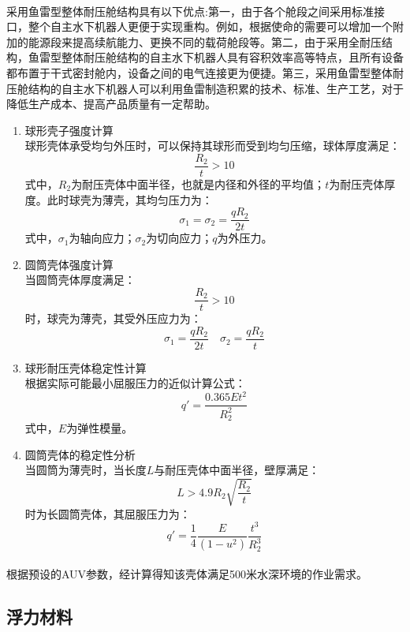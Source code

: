 \documentclass{ctexart}
\begin{document}
    \paragraph{}采用鱼雷型整体耐压舱结构具有以下优点:第一，由于各个舱段之间采用标准接口，整个自主水下机器人更便于实现重构。例如，根据使命的需要可以增加一个附加的能源段来提高续航能力、更换不同的载荷舱段等。第二，由于采用全耐压结构，鱼雷型整体耐压舱结构的自主水下机器人具有容积效率高等特点，且所有设备都布置于干式密封舱内，设备之间的电气连接更为便捷。第三，采用鱼雷型整体耐压舱结构的自主水下机器人可以利用鱼雷制造积累的技术、标准、生产工艺，对于降低生产成本、提高产品质量有一定帮助。
    \begin{enumerate}
        \item 球形壳子强度计算 \\
        球形壳体承受均匀外压时，可以保持其球形而受到均匀压缩，球体厚度满足：
        \[\frac{R_2}{t}>10\]
        式中，$R_2$为耐压壳体中面半径，也就是内径和外径的平均值；$t$为耐压壳体厚度。此时球壳为薄壳，其均匀压力为：
        \[\sigma_1=\sigma_2=\frac{qR_2}{2t}\]
        式中，$\sigma_1$为轴向应力；$\sigma_2$为切向应力；$q$为外压力。
        \item 圆筒壳体强度计算 \\
        当圆筒壳体厚度满足：
        \[\frac{R_2}{t}>10\]
        时，球壳为薄壳，其受外压应力为：
        \[\sigma_1=\frac{qR_2}{2t} \quad \sigma_2=\frac{qR_2}{t}\]
        \item 球形耐压壳体稳定性计算 \\
        根据实际可能最小屈服压力的近似计算公式：
        \[q'=\frac{0.365Et^2}{R_2^2}\]
        式中，$E$为弹性模量。
        \item 圆筒壳体的稳定性分析 \\
        当圆筒为薄壳时，当长度$L$与耐压壳体中面半径，壁厚满足：
        \[L>4.9R_2\sqrt{\frac{R_2}{t}}\]
        时为长圆筒壳体，其屈服压力为：
        \[q'=\frac{1}{4}\frac{E}{(1-u^2)}\frac{t^3}{R_2^3}\]
    \end{enumerate}
    \paragraph{}根据预设的AUV参数，经计算得知该壳体满足500米水深环境的作业需求。

    \subsection{浮力材料}
\end{document}
